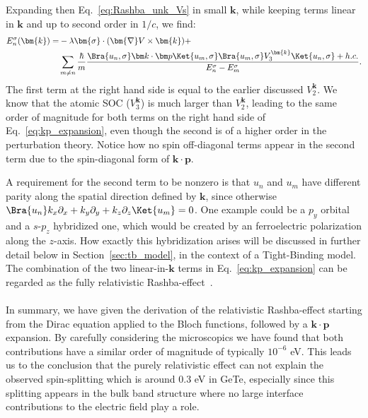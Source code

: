 Expanding then Eq.~\eqref{eq:Rashba_unk_Vs} in small $\bm{k}$, while keeping terms linear in $\bm{k}$ and up to second order in $1/c$, we find:
\begin{align}
	\label{eq:kp_expansion}
	E_n^{\sigma}(\bm{k}) =& -\lambda \bm{\sigma} \cdot ( \bm{\nabla}V \times \bm{k}) + \\
		& \sum_{m \neq n}\frac{\hbar}{m}\frac{\Bra{u_n,\sigma} \bm k \cdot \bm p \Ket{u_m, \sigma}\Bra{u_m, \sigma} V_3^{\bm{k}} \Ket{u_n, \sigma} + h.c.}{E_n^{\sigma} - E_m^{\sigma}}.\nonumber
\end{align}
The first term at the right hand side is equal to the earlier discussed $V^{\bm k}_2$.
We know that the atomic SOC ($V^{\bm k}_3$) is much larger than $V^{\bm{k}}_2$, leading to the same order of magnitude for both terms on the right hand side of Eq.~\eqref{eq:kp_expansion}, even though the second is of a higher order in the perturbation theory. Notice how no spin off-diagonal terms appear in the second term due to the spin-diagonal form of $\bm k \cdot \bm p$.

A requirement for the second term to be nonzero is that $u_n$ and $u_m$ have different parity along the spatial direction defined by $\bm{k}$, since otherwise $\Bra{u_n} k_x \partial_x + k_y \partial_y + k_z \partial_z \Ket{u_m} = 0$.
One example could be a $p_y$ orbital and a $s$-$p_z$ hybridized one, which would be created by an ferroelectric polarization along the $z$-axis.
How exactly this hybridization arises will be discussed in further detail below in Section~\ref{sec:tb_model}, in the context of a Tight-Binding model.
The combination of the two linear-in-$\bm{k}$ terms in Eq.~\eqref{eq:kp_expansion} can be regarded as the fully relativistic Rashba-effect~\cite{Bahramy2011}.
\\\\
In summary, we have given the derivation of the relativistic Rashba-effect starting from the Dirac equation applied to the Bloch functions, followed by a $\bm k \cdot \bm p$ expansion.
By carefully considering the microscopics we have found that both contributions have a similar order of magnitude of typically $10^{-6}$ eV.
This leads us to the conclusion that the purely relativistic effect can not explain the observed spin-splitting which is around 0.3 eV in GeTe, especially since this splitting appears in the bulk band structure where no large interface contributions to the electric field play a role.

